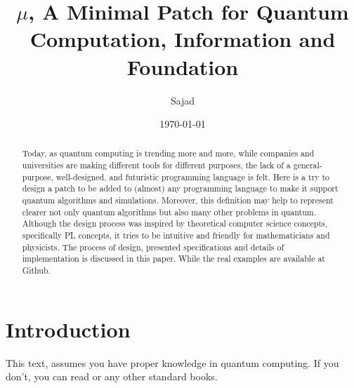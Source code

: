 \documentclass[a4paper,11pt]{article}
\title{\(\mu\), A Minimal Patch for Quantum Computation, Information and Foundation}
\author{Sajad}
\date{\today}
\begin{document}
\maketitle


\begin{abstract}
Today, as quantum computing is trending more and more, while companies and universities are making different tools for different purposes, the lack of a general-purpose, well-designed, and futuristic programming language is felt.
Here is a try to design a patch to be added to (almost) any programming language to make it support quantum algorithms and simulations. Moreover, this definition may help to represent clearer not only quantum algorithms but also many other problems in quantum.
Although the design process was inspired by theoretical computer science concepts, specifically PL concepts, it tries to be intuitive and friendly for mathematicians and physicists.
The process of design, presented specifications and details of implementation is discussed in this paper. While the real examples are available at Github.
\end{abstract}
\clearpage

\tableofcontents
\clearpage

\section{Introduction}

This text, assumes you have proper knowledge in quantum computing. If you don't, you can read \cite{neilson} or any other standard books.
\end{document}
